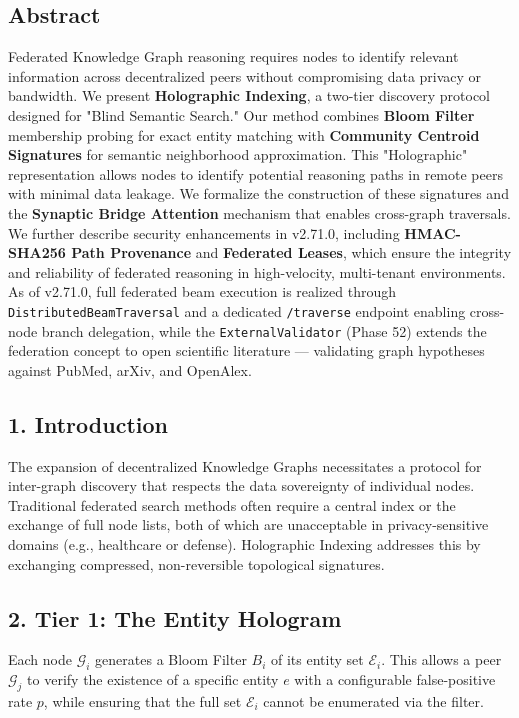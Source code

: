 
\subsection*{Abstract}
Federated Knowledge Graph reasoning requires nodes to identify relevant information across decentralized peers without compromising data privacy or bandwidth. We present \textbf{Holographic Indexing}, a two-tier discovery protocol designed for "Blind Semantic Search." Our method combines \textbf{Bloom Filter} \cite{bloom1970} membership probing for exact entity matching with \textbf{Community Centroid Signatures} for semantic neighborhood approximation. This "Holographic" representation allows nodes to identify potential reasoning paths in remote peers with minimal data leakage. We formalize the construction of these signatures and the \textbf{Synaptic Bridge Attention} mechanism that enables cross-graph traversals. We further describe security enhancements in v2.71.0, including \textbf{HMAC-SHA256 Path Provenance} \cite{gentry2009} and \textbf{Federated Leases}, which ensure the integrity and reliability of federated reasoning in high-velocity, multi-tenant environments. As of v2.71.0, full federated beam execution is realized through \texttt{DistributedBeamTraversal} and a dedicated \texttt{/traverse} endpoint enabling cross-node branch delegation, while the \texttt{ExternalValidator} (Phase 52) extends the federation concept to open scientific literature --- validating graph hypotheses against PubMed, arXiv, and OpenAlex.

\subsection*{1. Introduction}
The expansion of decentralized Knowledge Graphs necessitates a protocol for inter-graph discovery that respects the data sovereignty of individual nodes. Traditional federated search methods often require a central index or the exchange of full node lists, both of which are unacceptable in privacy-sensitive domains (e.g., healthcare or defense). Holographic Indexing addresses this by exchanging compressed, non-reversible topological signatures.

\subsection*{2. Tier 1: The Entity Hologram}
Each node $\mathcal{G}_i$ generates a Bloom Filter $B_i$ of its entity set $\mathcal{E}_i$. This allows a peer $\mathcal{G}_j$ to verify the existence of a specific entity $e$ with a configurable false-positive rate $p$, while ensuring that the full set $\mathcal{E}_i$ cannot be enumerated via the filter.

